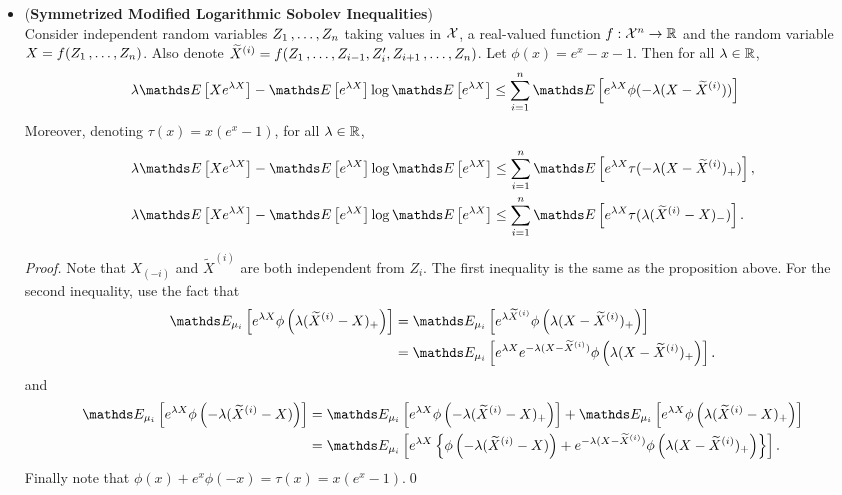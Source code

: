 \documentclass[11pt]{article}
\begin{document}
\begin{itemize}
\item \begin{proposition} (\textbf{Symmetrized Modified Logarithmic Sobolev Inequalities}) \citep{boucheron2013concentration}\\
Consider independent random variables $Z_1 \,{,}\ldots{,}\, Z_n$ taking values in ${\mathcal X}$, a real-valued function $f: {\mathcal X}^n \to {\mathbb R}$ and the random variable $X = f(Z_1 \,{,}\ldots{,}\, Z_n)$. Also denote $\widetilde{X}^{(i)} = f(Z_1 \,{,}\ldots{,}\, Z_{i-1}, Z_i', Z_{i+1} \,{,}\ldots{,}\, Z_n)$. Let $\phi(x) = e^x -x -1$.
Then for all $\lambda \in {\mathbb R}$,
\begin{align}
\lambda \E{}{Xe^{\lambda X}} - \E{}{e^{\lambda X}}\log\E{}{e^{\lambda X}} &\le \sum_{i=1}^{n}\E{}{e^{\lambda X}\phi(-\lambda(X - \widetilde{X}^{(i)}))}\label{ineqn: log_sobolev_inequality_sym_mgf}
\end{align} Moreover, denoting $\tau(x) = x(e^x - 1)$, for all $\lambda \in {\mathbb R}$,
\begin{align*}
\lambda \E{}{Xe^{\lambda X}} - \E{}{e^{\lambda X}}\log\E{}{e^{\lambda X}} &\le \sum_{i=1}^{n}\E{}{e^{\lambda X}\tau(-\lambda(X - \widetilde{X}^{(i)})_{+})},\\
\lambda \E{}{Xe^{\lambda X}} - \E{}{e^{\lambda X}}\log\E{}{e^{\lambda X}} &\le \sum_{i=1}^{n}\E{}{e^{\lambda X}\tau(\lambda(\widetilde{X}^{(i)} - X)_{-})}.
\end{align*}
\end{proposition}
\begin{proof}
Note that $X_{(-i)}$ and $\widetilde{X}^{(i)}$ are both independent from $Z_i$. The first inequality is the same as the proposition above. For the second inequality, use the fact that
\begin{align*}
\E{\mu_i}{e^{\lambda X}\phi\paren{\lambda (\widetilde{X}^{(i)} - X)_{+}}} &= \E{\mu_i}{e^{\lambda \widetilde{X}^{(i)} }\phi\paren{\lambda (X - \widetilde{X}^{(i)})_{+}}}\\
&= \E{\mu_i}{e^{\lambda X}e^{-\lambda ( X- \widetilde{X}^{(i)}) }\phi\paren{\lambda (X - \widetilde{X}^{(i)})_{+}}}.
\end{align*} and
\begin{align*}
\E{\mu_i}{e^{\lambda X}\phi\paren{-\lambda (\widetilde{X}^{(i)} - X)}} &= \E{\mu_i}{e^{\lambda X}\phi\paren{-\lambda (\widetilde{X}^{(i)} - X)_{+}}} + \E{\mu_i}{e^{\lambda X}\phi\paren{\lambda (\widetilde{X}^{(i)} - X)_{+}}}\\
&= \E{\mu_i}{e^{\lambda X}\set{\phi\paren{-\lambda (\widetilde{X}^{(i)} - X)} + e^{-\lambda ( X- \widetilde{X}^{(i)}) }\phi\paren{\lambda (X - \widetilde{X}^{(i)})_{+}}}}.
\end{align*} Finally note that $\phi(x) + e^x \phi(-x) = \tau(x) = x(e^x - 1)$.\qed
\end{proof}


\end{itemize}
\end{document}
